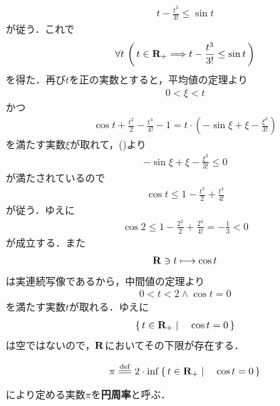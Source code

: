 	\begin{align}
		t - \frac{t^3}{3!} \leq \sin{t}
	\end{align}
	が従う．これで
	\begin{align}
		\forall t\, \left(\, t \in \mathbf{R}_{+} 
		\Longrightarrow t - \frac{t^3}{3!} \leq \sin{t}\, \right)
		\label{fom:existence_of_pi_3}
	\end{align}
	を得た．再び$t$を正の実数とすると，平均値の定理より
	\begin{align}
		0 < \xi < t
	\end{align}
	かつ
	\begin{align}
		\cos{t} + \frac{t^2}{2} - \frac{t^4}{4!} - 1 = t \cdot \left(-\sin{\xi} + \xi - \frac{\xi^3}{3!}\right)
	\end{align}
	を満たす実数$\xi$が取れて，()より
	\begin{align}
		-\sin{\xi} + \xi - \frac{\xi^3}{3!} \leq 0
	\end{align}
	が満たされているので
	\begin{align}
		\cos{t} \leq 1 - \frac{t^2}{2} + \frac{t^4}{4!}
	\end{align}
	が従う．ゆえに
	\begin{align}
		\cos{2} \leq 1 - \frac{2^2}{2} + \frac{2^4}{4!} = -\frac{1}{3} < 0
	\end{align}
	が成立する．また
	\begin{align}
		\mathbf{R} \ni t \longmapsto \cos{t}
	\end{align}
	は実連続写像であるから，中間値の定理より
	\begin{align}
		0 < t < 2 \wedge \cos{t} = 0
	\end{align}
	を満たす実数$t$が取れる．ゆえに
	\begin{align}
		\left\{\, t \in \mathbf{R}_+ \mid \quad \cos{t} = 0\, \right\}
	\end{align}
	は空ではないので，$\mathbf{R}$においてその下限が存在する．
	
	\begin{screen}
		\begin{dfn}[円周率]
			\begin{align}
				\pi \defeq 2 \cdot \inf{}{\Set{t \in \R_+}{\cos{t} = 0}}
			\end{align}
			により定める実数$\pi$を{\bf 円周率}と呼ぶ．
		\end{dfn}
	\end{screen}
	
